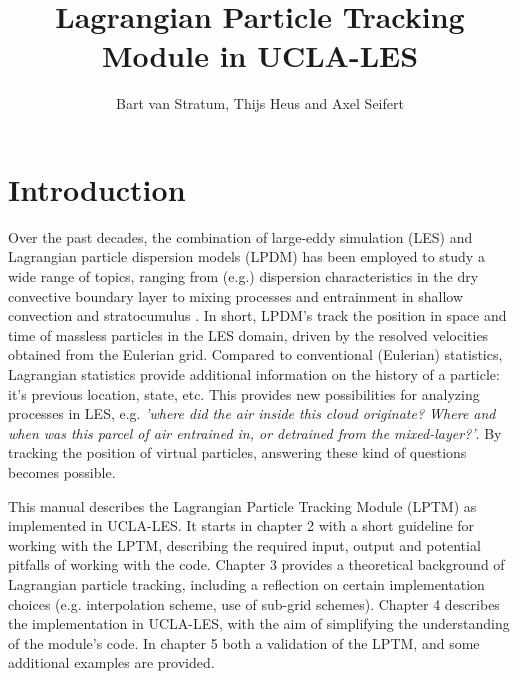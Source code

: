 \documentclass[twoside,a4paper]{report}
\title{Lagrangian Particle Tracking Module in UCLA-LES
}
\author{Bart van Stratum, Thijs Heus and Axel Seifert}
\begin{document}
\maketitle

\tableofcontents

\chapter{Introduction}

Over the past decades, the combination of large-eddy simulation (LES) and Lagrangian particle dispersion models (LPDM) has been employed to study a wide range of topics, ranging from (e.g.) dispersion characteristics in the dry convective boundary layer \citep{mason1992,weil2004,dosio2005,verzijlbergh2009} to mixing processes and entrainment in shallow convection and stratocumulus \citep{heus2008,yamaguchi2012}. In short, LPDM's track the position in space and time of massless particles in the LES domain, driven by the resolved velocities obtained from the Eulerian grid. Compared to conventional (Eulerian) statistics, Lagrangian statistics provide additional information on the history of a particle: it's previous location, state, etc. This provides new possibilities for analyzing processes in LES, e.g. \textit{'where did the air inside this cloud originate? Where and when was this parcel of air entrained in, or detrained from the mixed-layer?'}. By tracking the position of virtual particles, answering these kind of questions becomes possible.\newline

This manual describes the Lagrangian Particle Tracking Module (LPTM) as implemented in UCLA-LES. It starts in chapter 2 with a short guideline for working with the LPTM, describing the required input, output and potential pitfalls of working with the code. Chapter 3 provides a theoretical background of Lagrangian particle tracking, including a reflection on certain implementation choices (e.g. interpolation scheme, use of sub-grid schemes). Chapter 4 describes the implementation in UCLA-LES, with the aim of simplifying the understanding of the module's code. In chapter 5 both a validation of the LPTM, and some additional examples are provided.
\end{document}
